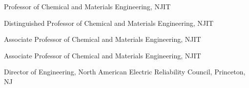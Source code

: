 %
%

        {Professor of Chemical and Materials Engineering, NJIT}


       {Distinguished Professor of Chemical and Materials Engineering, NJIT}

       {Associate Professor of Chemical and Materials Engineering, NJIT}

       {Associate Professor of Chemical and Materials Engineering, NJIT}

       {Director of Engineering, North American Electric Reliability Council, Princeton, NJ}
